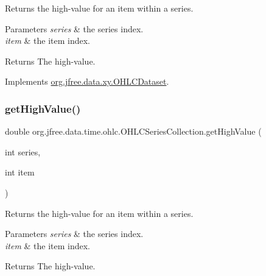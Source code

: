 Returns the high-\/value for an item within a series.


\begin{DoxyParams}{Parameters}
{\em series} & the series index. \\
\hline
{\em item} & the item index.\\
\hline
\end{DoxyParams}
\begin{DoxyReturn}{Returns}
The high-\/value. 
\end{DoxyReturn}


Implements \mbox{\hyperlink{interfaceorg_1_1jfree_1_1data_1_1xy_1_1_o_h_l_c_dataset_a03f647b09b1a04ae0c2eb2bc5116d4d4}{org.\+jfree.\+data.\+xy.\+O\+H\+L\+C\+Dataset}}.

\mbox{\label{classorg_1_1jfree_1_1data_1_1time_1_1ohlc_1_1_o_h_l_c_series_collection_ae49cdfb833330fec9bb8a8e21683945c}} 
\subsubsection{\texorpdfstring{get\+High\+Value()}{getHighValue()}}
{\footnotesize\ttfamily double org.\+jfree.\+data.\+time.\+ohlc.\+O\+H\+L\+C\+Series\+Collection.\+get\+High\+Value (\begin{DoxyParamCaption}\item[{int}]{series,  }\item[{int}]{item }\end{DoxyParamCaption})}

Returns the high-\/value for an item within a series.


\begin{DoxyParams}{Parameters}
{\em series} & the series index. \\
\hline
{\em item} & the item index.\\
\hline
\end{DoxyParams}
\begin{DoxyReturn}{Returns}
The high-\/value. 
\end{DoxyReturn}


